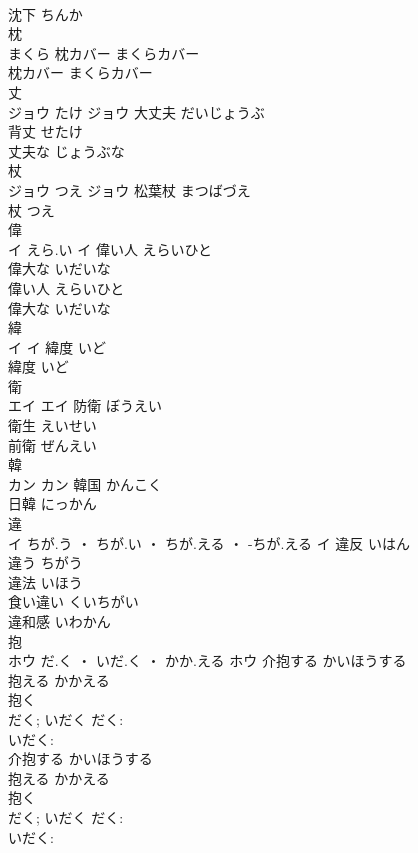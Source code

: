\documentclass[8pt]{extreport}
\begin{document}
\begin{CJK}{UTF8}{min}
\\	沈下	ちんか	
\\	枕	
\\	まくら		枕カバー	まくらカバー	
\\	枕カバー	まくらカバー	
\\	丈	
\\	ジョウ	たけ	ジョウ	大丈夫	だいじょうぶ	
\\	背丈	せたけ	
\\	丈夫な	じょうぶな	
\\	杖	
\\	ジョウ	つえ	ジョウ													松葉杖	まつばづえ	
\\	杖	つえ	
\\	偉	
\\	イ	えら.い	イ	偉い人	えらいひと	
\\	偉大な	いだいな	
\\	偉い人	えらいひと	
\\	偉大な	いだいな	
\\	緯	
\\	イ		イ	緯度	いど	
\\	緯度	いど	
\\	衛	
\\	エイ		エイ	防衛	ぼうえい	
\\	衛生	えいせい	
\\	前衛	ぜんえい	
\\	韓	
\\	カン		カン	韓国	かんこく	
\\	日韓	にっかん	
\\	違	
\\	イ	ちが.う ・ ちが.い ・ ちが.える ・ -ちが.える	イ	違反	いはん	
\\	違う	ちがう	
\\	違法	いほう	
\\	食い違い	くいちがい	
\\	違和感	いわかん	
\\	抱	
\\	ホウ	だ.く ・ いだ.く ・ かか.える	ホウ	介抱する	かいほうする	
\\	抱える	かかえる	
\\	抱く 
\\	だく; いだく	だく: 
\\	いだく: 
\\	介抱する	かいほうする	
\\	抱える	かかえる	
\\	抱く 
\\	だく; いだく	だく: 
\\	いだく: 

\end{CJK}
\end{document}
